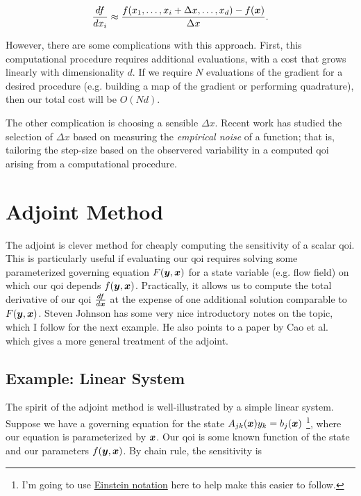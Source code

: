 \documentclass[../primer.tex]{subfiles}
\begin{document}
\begin{equation}
  \frac{df}{dx_i} \approx \frac{f(x_1,\dots,x_i+\Delta x,\dots,x_d) - f(\boldsymbol{x})}{\Delta x}.
\end{equation}

However, there are some complications with this approach. First, this
computational procedure requires additional evaluations, with a cost that grows
linearly with dimensionality \(d\). If we require \(N\) evaluations of the gradient
for a desired procedure (e.g. building a map of the gradient or performing
quadrature), then our total cost will be \(O(Nd)\).

The other complication is choosing a sensible \(\Delta x\). Recent work has
studied the selection of \(\Delta x\) based on measuring the \emph{empirical noise} of
a function; that is, tailoring the step-size based on the observered variability
in a computed qoi arising from a computational procedure.\cite{more2012}

\section{Adjoint Method}
\label{sec:org39314ad}
The adjoint is clever method for cheaply computing the sensitivity of a scalar
qoi. This is particularly useful if evaluating our qoi requires solving some
parameterized governing equation \(F(\boldsymbol{y},\boldsymbol{x})\) for a state variable (e.g. flow
field) on which our qoi depends \(f(\boldsymbol{y},\boldsymbol{x})\). Practically, it allows us to
compute the total derivative of our qoi \(\frac{df}{d\boldsymbol{x}}\) at the expense of one
additional solution comparable to \(F(\boldsymbol{y},\boldsymbol{x})\). Steven Johnson \cite{johnson2012}
has some very nice introductory notes on the topic, which I follow for the next
example. He also points to a paper by Cao et al.\cite{cao2003adjoint} which gives
a more general treatment of the adjoint.

\subsection{Example: Linear System}
\label{sec:org3c66c8a}
The spirit of the adjoint method is well-illustrated by a simple linear system.
Suppose we have a governing equation for the state \(A_{jk}(\boldsymbol{x})y_k=b_j(\boldsymbol{x})\)
\footnote{I'm going to use \href{https://en.wikipedia.org/wiki/Einstein\_notation}{Einstein notation} here to help make this easier to
follow.}, where our equation is parameterized by \(\boldsymbol{x}\). Our qoi is some known
function of the state and our parameters \(f(\boldsymbol{y},\boldsymbol{x})\). By chain rule, the
sensitivity is
\end{document}
